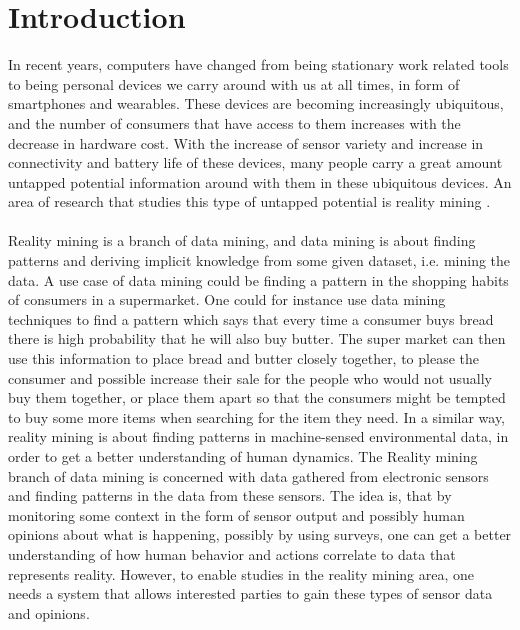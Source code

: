 \chapter{Introduction}
\label{cha:introduction}

In recent years, computers have changed from being stationary work related tools to being personal devices we carry around with us at all times, in form of smartphones and wearables. These devices are becoming increasingly ubiquitous, and the number of consumers that have access to them increases with the decrease in hardware cost. With the increase of sensor variety and increase in connectivity and battery life of these devices, many people carry a great amount untapped potential information around with them in these ubiquitous devices.  An area of research that studies this type of untapped potential is reality mining \parencite{eagle2006_reality_mining_definition}.
\\\\
Reality mining is a branch of data mining, and data mining is about finding patterns and deriving implicit knowledge from some given dataset, i.e. mining the data. A use case of data mining could be finding a pattern in the shopping habits of consumers in a supermarket. One could for instance use data mining techniques to find a pattern which says that every time a consumer buys bread there is high probability that he will also buy butter.
The super market can then use this information to place bread and butter closely together, to please the consumer and possible increase their sale for the people who would not usually buy them together, or place them apart so that the consumers might be tempted to buy some more items when searching for the item they need. In a similar way, reality mining is about finding patterns in machine-sensed environmental data, in order to get a better understanding of human dynamics. The Reality mining branch of data mining is concerned with data gathered from electronic sensors and finding patterns in the data from these sensors. The idea is, that by monitoring some context in the form of sensor output and possibly human opinions about what is happening, possibly by using surveys, one can get a better understanding of how human behavior and actions correlate to data that represents reality. However, to enable studies in the reality mining area, one needs a system that allows interested parties to gain these types of sensor data and opinions. 
\\\\
